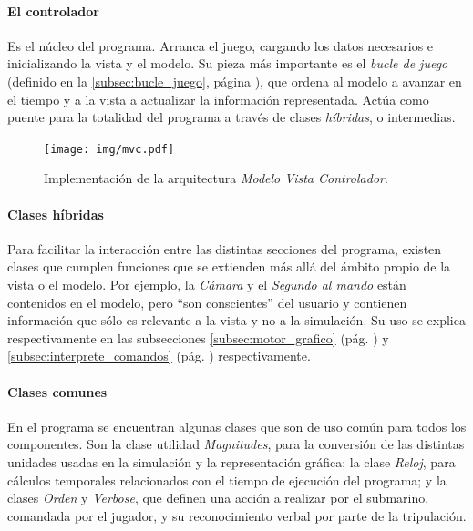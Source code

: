 \documentclass[a4paper,
	11pt,
	parskip=full,
	bibliography=totoc,
	twoside
	]{scrartcl}
\begin{document}
		\paragraph{El controlador}
			Es el núcleo del programa. Arranca el juego, cargando los datos necesarios e inicializando la vista y el modelo. Su pieza más importante es el \textit{bucle de juego} (definido en la \autoref{subsec:bucle_juego}, página \pageref{subsec:bucle_juego}), que ordena al modelo a avanzar en el tiempo y a la vista a actualizar la información representada. Actúa como puente para la totalidad del programa a través de clases \textit{híbridas}, o intermedias.
		
		\vspace{1cm}
		\begin{figure}[h]
			\centering
			\texttt{[image: img/mvc.pdf]}
			\caption{Implementación de la arquitectura \textit{Modelo Vista Controlador}.}
			\label{fig:mvc}
		\end{figure}
			
		\paragraph{Clases híbridas}
			Para facilitar la interacción entre las distintas secciones del programa, existen clases que cumplen funciones que se extienden más allá del ámbito propio de la vista o el modelo. Por ejemplo, la \textit{Cámara} y el \textit{Segundo al mando} están contenidos en el modelo, pero ``son conscientes'' del usuario y contienen información que sólo es relevante a la vista y no a la simulación.  Su uso se explica respectivamente en las subsecciones \ref{subsec:motor_grafico}  (pág. \pageref{subsec:motor_grafico}) y \ref{subsec:interprete_comandos}  (pág. \pageref{subsec:interprete_comandos}) respectivamente.
			
		\paragraph{Clases comunes}
			En el programa se encuentran algunas clases que son de uso común para todos los componentes. Son la clase utilidad \textit{Magnitudes}, para la conversión de las distintas unidades usadas en la simulación y la representación gráfica; la clase \textit{Reloj}, para cálculos temporales relacionados con el tiempo de ejecución del programa; y la clases \textit{Orden} y \textit{Verbose}, que definen una acción a realizar por el submarino, comandada por el jugador, y su reconocimiento verbal por parte de la tripulación.
			
\end{document}
